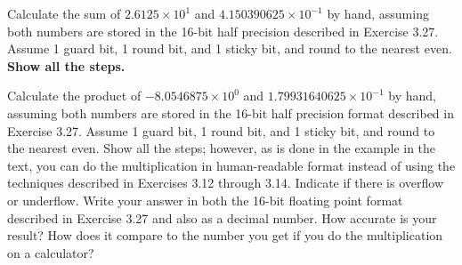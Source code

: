 \documentclass[a4paper]{ctexart}
\begin{document}
Calculate the sum of $2.6125 \times {10}^{1}$ and $4.150390625 \times {10}^{-1}$ by hand,
assuming both numbers are stored in the 16-bit half precision described in Exercise 3.27.
Assume 1 guard bit, 1 round bit, and 1 sticky bit, and round to the nearest even.
\textbf{Show all the steps.}

Calculate the product of $-8.0546875 \times {10}^{0}$ and $1.79931640625 \times {10}^{-1}$ by hand,
assuming both numbers are stored in the 16-bit half precision format described in Exercise 3.27.
Assume 1 guard bit, 1 round bit, and 1 sticky bit, and round to the nearest even.
Show all the steps;
however, as is done in the example in the text, you can do the multiplication in human-readable format instead of using the techniques described in Exercises 3.12 through 3.14.
Indicate if there is overflow or underflow.
Write your answer in both the 16-bit floating point format described in Exercise 3.27
and also as a decimal number.
How accurate is your result?
How does it compare to the number you get if you do the multiplication on a calculator?
\end{document}

